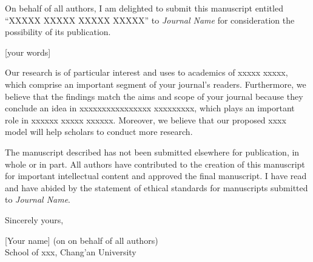 \documentclass{article}
\begin{document}
On behalf of all authors, I am delighted to submit this manuscript entitled “XXXXX XXXXX XXXXX XXXXX” to \textit{Journal Name} for consideration the possibility of its publication.

[your words]

Our research is of particular interest and uses to academics of xxxxx xxxxx, which comprise an important segment of your journal's readers. Furthermore, we believe that the findings match the aims and scope of your journal because they conclude an idea in xxxxxxxxxxxxxxxx xxxxxxxxx, which plays an important role in xxxxxx xxxxx xxxxxx. Moreover, we believe that our proposed xxxx model will help scholars to conduct more research.

The manuscript described has not been submitted elsewhere for publication, in whole or in part. All authors have contributed to the creation of this manuscript for important intellectual content and approved the final manuscript. I have read and have abided by the statement of ethical standards for manuscripts submitted to \textit{Journal Name}.

\bigskip %

Sincerely yours,

\vspace{20pt} %

[Your name] (on on behalf of all authors)\\
School of xxx, Chang'an University
\end{document}
